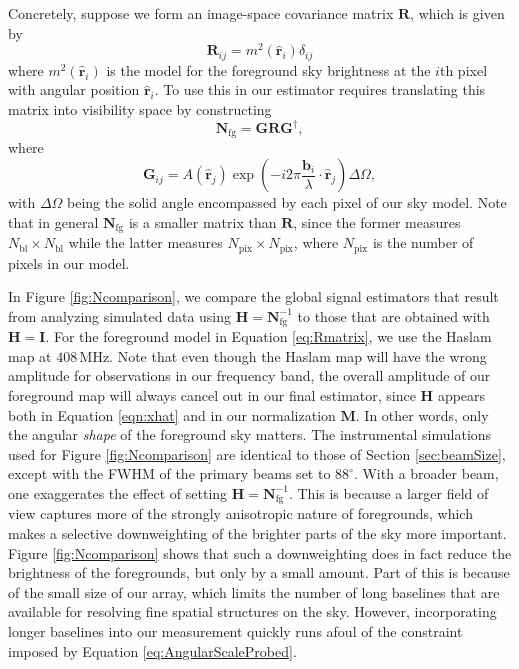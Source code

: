\documentclass[twocolumn,apj,numberedappendix]{emulateapj}
\newcommand{\Hmat}{\mathbf{H}}
\newcommand{\Nfg}{\mathbf{N}_{\textrm{fg}}}
\newcommand{\M}{\mathbf{M}}
\newcommand{\R}{\mathbf{R}}
\newcommand{\rhat}{\hat{\mathbf{r}}}
\begin{document}
Concretely, suppose we form an image-space covariance matrix $\R$, which is given by
\begin{equation}
\label{eq:Rmatrix}
\R_{ij} = m^2(\rhat_i) \delta_{ij}
\end{equation}
where $m^2(\rhat_i)$ is the model for the foreground sky brightness at the $i$th pixel with angular position $\rhat_i$. To use this in our estimator requires translating this matrix into visibility space by constructing
\begin{equation}
\label{eq:GRG}
\Nfg = \mathbf{G} \R \mathbf{G}^\dagger,
\end{equation}
where
\begin{equation}
\mathbf{G}_{ij} = A(\rhat_j)\exp\left(-i2\pi \frac{\mathbf{b_\textit{i}}}{\lambda} \cdot \boldsymbol \rhat_j\right) \Delta \Omega,
\end{equation}
with $\Delta \Omega$ being the solid angle encompassed by each pixel of our sky model. Note that in general $\Nfg$ is a smaller matrix than $\R$, since the former measures $N_\textrm{bl} \times N_\textrm{bl}$ while the latter measures $N_\textrm{pix} \times N_\textrm{pix}$, where $N_\textrm{pix}$ is the number of pixels in our model.

In Figure \ref{fig:Ncomparison}, we compare the global signal estimators that result from analyzing simulated data using $\Hmat = \Nfg^{-1}$ to those that are obtained with $\Hmat = \mathbf{I}$. For the foreground model in Equation \eqref{eq:Rmatrix}, we use the Haslam map at $408\,\textrm{MHz}$. Note that even though the Haslam map will have the wrong amplitude for observations in our frequency band, the overall amplitude of our foreground map will always cancel out in our final estimator, since $\Hmat$ appears both in Equation \eqref{eqn:xhat} and in our normalization $\M$. In other words, only the angular \emph{shape} of the foreground sky matters. The instrumental simulations used for Figure \ref{fig:Ncomparison} are identical to those of Section \ref{sec:beamSize}, except with the FWHM of the primary beams set to $88^\circ$. With a broader beam, one exaggerates the effect of setting $\Hmat = \Nfg^{-1}$. This is because a larger field of view captures more of the strongly anisotropic nature of foregrounds, which makes a selective downweighting of the brighter parts of the sky more important. Figure \ref{fig:Ncomparison} shows that such a downweighting does in fact reduce the brightness of the foregrounds, but only by a small amount. Part of this is because of the small size of our array, which limits the number of long baselines that are available for resolving fine spatial structures on the sky. However, incorporating longer baselines into our measurement quickly runs afoul of the constraint imposed by Equation \eqref{eq:AngularScaleProbed}.
\end{document}
